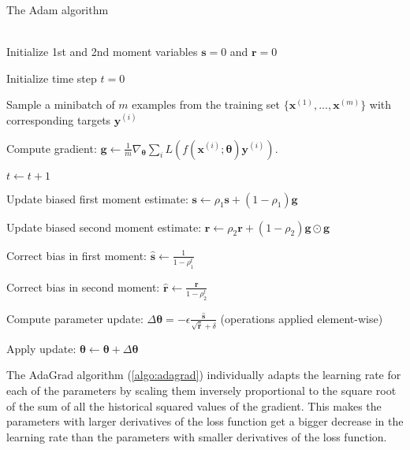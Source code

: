 \begin{algorithm}
\caption{The Adam algorithm}\label{alg:Adam}
    \label{algo:adam}
\begin{algorithmic}
    \Require{Exponential decay rates for momentum estimates, $\rho_1$ and
    $\rho_2$ in $[0,1)$. (Suggested defaults: 0.9 and 0.999 respectively)}
    \\
    Initialize 1st and 2nd moment variables $\boldsymbol{s}=0$ and
    $\boldsymbol{r}=0$

    Initialize time step $t=0$


        Sample a minibatch of $m$ examples from the training set
        $\{\boldsymbol{x}^{(1)}, ..., \boldsymbol{x}^{(m)}\}$ with corresponding
        targets $\boldsymbol{y}^{(i)}$
        
        Compute gradient: $\boldsymbol{g} \gets
        \frac{1}{m}\nabla_{\boldsymbol\theta}
        \sum_{i}L(f(\boldsymbol{x}^{(i)};\boldsymbol{\theta})\boldsymbol{y}^{(i)})$.
        
        $t\gets t+1$

        Update biased first moment estimate: $\boldsymbol{s}\gets
        \rho_1\boldsymbol{s} + (1-\rho_1)\boldsymbol{g}$

        Update biased second moment estimate: $\boldsymbol{r}\gets
        \rho_2\boldsymbol{r} + (1-\rho_2)\boldsymbol{g}\odot\boldsymbol{g}$

        Correct bias in first moment: $\hat{\boldsymbol{s}}\gets
        \frac{1}{1-\rho_1^t}$

        Correct bias in second moment: $\hat{\boldsymbol{r}}\gets
        \frac{\boldsymbol{r}}{1-\rho_2^t}$

        Compute parameter update: $\Delta\boldsymbol\theta =
        -\epsilon\frac{\hat{\boldsymbol{s}}}{\sqrt{\hat{\boldsymbol{r}}}+\delta}$
        (operations applied element-wise)

        Apply update: $\boldsymbol\theta\gets \boldsymbol\theta +
        \Delta\boldsymbol\theta$
    \EndWhile
\end{algorithmic}
\end{algorithm}

The AdaGrad algorithm (\ref{algo:adagrad}) individually adapts
the learning rate for each of the parameters by scaling them inversely
proportional to the square root of the sum of all the historical squared values
of the gradient. This makes the parameters with larger derivatives of the loss
function get a bigger decrease in the learning rate than the parameters with
smaller derivatives of the loss function.

